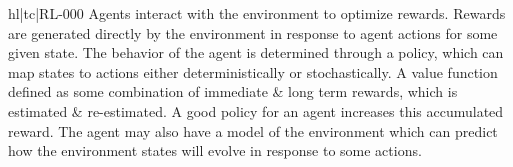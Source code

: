 hl|tc|RL-000
Agents interact with the environment to optimize rewards. Rewards are generated directly by the environment in response to agent actions for some given state. The behavior of the agent is determined through a policy, which can map states to actions either deterministically or stochastically. A value function defined as some combination of immediate & long term rewards, which is estimated & re-estimated. A good policy for an agent increases this accumulated reward. The agent may also have a model of the environment which can predict how the environment states will evolve in response to some actions.
